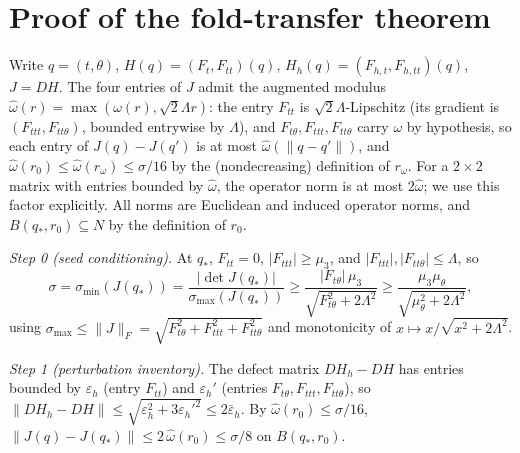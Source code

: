 
\section{Proof of the fold-transfer theorem}
\label{sm:fold-transfer-proof}

Write \(q=(t,\theta)\), \(H(q)=(F_t,F_{tt})(q)\),
\(H_h(q)=(F_{h,t},F_{h,tt})(q)\), \(J=DH\). The four entries of \(J\)
admit the augmented modulus \(\hat\omega(r)=\max(\omega(r),\sqrt2\Lambda r)\):
the entry \(F_{tt}\) is
\(\sqrt2\Lambda\)-Lipschitz (its gradient is \((F_{ttt},F_{tt\theta})\),
bounded entrywise by \(\Lambda\)), and \(F_{t\theta},F_{ttt},F_{tt\theta}\)
carry \(\omega\) by hypothesis, so each entry of \(J(q)-J(q')\) is at most
\(\hat\omega(\|q-q'\|)\), and \(\hat\omega(r_0)\le\hat\omega(r_\omega)\le
\sigma/16\) by the (nondecreasing) definition of \(r_\omega\). For a
\(2\times2\) matrix with entries bounded by \(\hat\omega\), the operator
norm is at most \(2\hat\omega\); we use this factor explicitly. All norms are
Euclidean and induced operator norms, and \(B(q_*,r_0)\subseteq N\) by the
definition of \(r_0\).

\emph{Step 0 (seed conditioning).} At \(q_*\), \(F_{tt}=0\),
\(|F_{ttt}|\ge\mu_3\), and \(|F_{ttt}|,|F_{tt\theta}|\le\Lambda\), so
\[
\sigma=\sigma_{\min}(J(q_*))
=\frac{|\det J(q_*)|}{\sigma_{\max}(J(q_*))}
\ge\frac{|F_{t\theta}|\,\mu_3}{\sqrt{F_{t\theta}^2+2\Lambda^2}}
\ge\frac{\mu_3\mu_\theta}{\sqrt{\mu_\theta^2+2\Lambda^2}},
\]
using \(\sigma_{\max}\le\|J\|_F=\sqrt{F_{t\theta}^2+F_{ttt}^2+F_{tt\theta}^2}\)
and monotonicity of \(x\mapsto x/\sqrt{x^2+2\Lambda^2}\).

\emph{Step 1 (perturbation inventory).} The defect matrix \(DH_h-DH\) has
entries bounded by \(\varepsilon_h\) (entry \(F_{tt}\)) and
\(\varepsilon_h'\) (entries \(F_{t\theta},F_{ttt},F_{tt\theta}\)), so
\(\|DH_h-DH\|\le\sqrt{\varepsilon_h^2+3\varepsilon_h'^2}
\le2\bar\varepsilon_h\). By \(\hat\omega(r_0)\le\sigma/16\),
\(\|J(q)-J(q_*)\|\le2\,\hat\omega(r_0)\le\sigma/8\) on \(B(q_*,r_0)\).

